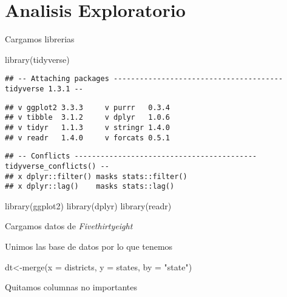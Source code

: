 \documentclass[
]{book}
\newenvironment{Shaded}{\begin{snugshade}}{\end{snugshade}}
\newcommand{\AttributeTok}[1]{\textcolor[rgb]{0.77,0.63,0.00}{#1}}
\newcommand{\FunctionTok}[1]{\textcolor[rgb]{0.00,0.00,0.00}{#1}}
\newcommand{\NormalTok}[1]{#1}
\newcommand{\OtherTok}[1]{\textcolor[rgb]{0.56,0.35,0.01}{#1}}
\newcommand{\StringTok}[1]{\textcolor[rgb]{0.31,0.60,0.02}{#1}}
\begin{document}
\hypertarget{analisis-exploratorio}{%
\chapter{Analisis Exploratorio}\label{analisis-exploratorio}}

Cargamos librerias

\begin{Shaded}
\begin{Highlighting}[]
\FunctionTok{library}\NormalTok{(tidyverse)}
\end{Highlighting}
\end{Shaded}

\begin{verbatim}
## -- Attaching packages --------------------------------------- tidyverse 1.3.1 --
\end{verbatim}

\begin{verbatim}
## v ggplot2 3.3.3     v purrr   0.3.4
## v tibble  3.1.2     v dplyr   1.0.6
## v tidyr   1.1.3     v stringr 1.4.0
## v readr   1.4.0     v forcats 0.5.1
\end{verbatim}

\begin{verbatim}
## -- Conflicts ------------------------------------------ tidyverse_conflicts() --
## x dplyr::filter() masks stats::filter()
## x dplyr::lag()    masks stats::lag()
\end{verbatim}

\begin{Shaded}
\begin{Highlighting}[]
\FunctionTok{library}\NormalTok{(ggplot2)}
\FunctionTok{library}\NormalTok{(dplyr)}
\FunctionTok{library}\NormalTok{(readr)}
\end{Highlighting}
\end{Shaded}

Cargamos datos de \emph{Fivethirtyeight}

Unimos las base de datos por lo que tenemos

\begin{Shaded}
\begin{Highlighting}[]
\NormalTok{dt}\OtherTok{\textless{}{-}}\FunctionTok{merge}\NormalTok{(}\AttributeTok{x =}\NormalTok{ districts, }\AttributeTok{y =}\NormalTok{ states, }\AttributeTok{by =} \StringTok{"state"}\NormalTok{)}
\end{Highlighting}
\end{Shaded}

Quitamos columnas no importantes
\end{document}
